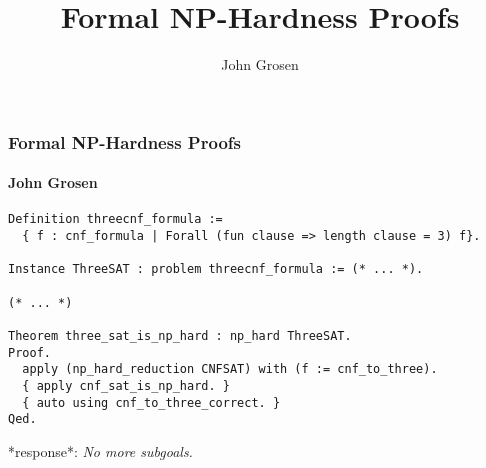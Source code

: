 \documentclass{beamer}
\title{Formal NP-Hardness Proofs}
\author{John Grosen}
\begin{document}
\begin{frame}[fragile]
  \frametitle{Formal NP-Hardness Proofs}
  \framesubtitle{John Grosen}

\begin{verbatim}
Definition threecnf_formula :=
  { f : cnf_formula | Forall (fun clause => length clause = 3) f}.

Instance ThreeSAT : problem threecnf_formula := (* ... *).

(* ... *)

Theorem three_sat_is_np_hard : np_hard ThreeSAT.
Proof.
  apply (np_hard_reduction CNFSAT) with (f := cnf_to_three).
  { apply cnf_sat_is_np_hard. }
  { auto using cnf_to_three_correct. }
Qed.
\end{verbatim}

\vspace{4ex}
*response*: \emph{No more subgoals.}
\end{frame}
\end{document}
